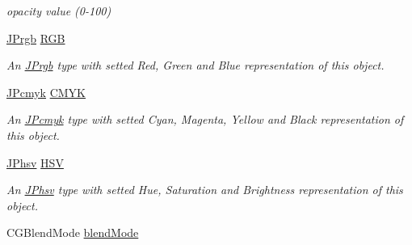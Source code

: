 \begin{DoxyCompactItemize}
\begin{DoxyCompactList}\small\item\em opacity value (0-\/100) \item\end{DoxyCompactList}\item 
\hypertarget{interface_j_p_color_a659b3f9caaf643fc6e9643b8470014f6}{
\hyperlink{struct_j_prgb}{JPrgb} \hyperlink{interface_j_p_color_a659b3f9caaf643fc6e9643b8470014f6}{RGB}}
\label{interface_j_p_color_a659b3f9caaf643fc6e9643b8470014f6}

\begin{DoxyCompactList}\small\item\em An \hyperlink{struct_j_prgb}{JPrgb} type with setted Red, Green and Blue representation of this object. \item\end{DoxyCompactList}\item 
\hypertarget{interface_j_p_color_a06d575f03ff1692f65871d0485b62ae6}{
\hyperlink{struct_j_pcmyk}{JPcmyk} \hyperlink{interface_j_p_color_a06d575f03ff1692f65871d0485b62ae6}{CMYK}}
\label{interface_j_p_color_a06d575f03ff1692f65871d0485b62ae6}

\begin{DoxyCompactList}\small\item\em An \hyperlink{struct_j_pcmyk}{JPcmyk} type with setted Cyan, Magenta, Yellow and Black representation of this object. \item\end{DoxyCompactList}\item 
\hypertarget{interface_j_p_color_a00bf425621fe08bd7eb6154be6b5a8a9}{
\hyperlink{struct_j_phsv}{JPhsv} \hyperlink{interface_j_p_color_a00bf425621fe08bd7eb6154be6b5a8a9}{HSV}}
\label{interface_j_p_color_a00bf425621fe08bd7eb6154be6b5a8a9}

\begin{DoxyCompactList}\small\item\em An \hyperlink{struct_j_phsv}{JPhsv} type with setted Hue, Saturation and Brightness representation of this object. \item\end{DoxyCompactList}\item 
\hypertarget{interface_j_p_color_aa1fe8baa6f05c753211a016c18a86ce5}{
CGBlendMode \hyperlink{interface_j_p_color_aa1fe8baa6f05c753211a016c18a86ce5}{blendMode}}
\label{interface_j_p_color_aa1fe8baa6f05c753211a016c18a86ce5}


\end{DoxyCompactItemize}
